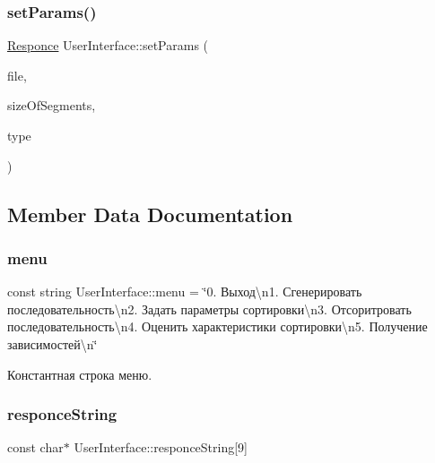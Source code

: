 \subsubsection{\texorpdfstring{set\+Params()}{setParams()}}
{\footnotesize\ttfamily \hyperlink{_structures_8h_a9864d6ef28dd6e38416afac4426b3491}{Responce} User\+Interface\+::set\+Params (\begin{DoxyParamCaption}\item[{\hyperlink{class_file_manager}{File\+Manager} $\ast$}]{file,  }\item[{long long}]{size\+Of\+Segments,  }\item[{\hyperlink{_structures_8h_adbb15722785daaf5166f7ea34323854c}{Type\+Of\+Sort}}]{type }\end{DoxyParamCaption})\hspace{0.3cm}{\ttfamily [private]}}



\subsection{Member Data Documentation}
\hypertarget{class_user_interface_a24b9a8a0a253382b0737a86f7ecf7d8b}{}\label{class_user_interface_a24b9a8a0a253382b0737a86f7ecf7d8b} 
\subsubsection{\texorpdfstring{menu}{menu}}
{\footnotesize\ttfamily const string User\+Interface\+::menu = \char`\"{}0. Выход\textbackslash{}n1. Сгенерировать последовательность\textbackslash{}n2. Задать параметры сортировки\textbackslash{}n3. Отсоритровать последовательность\textbackslash{}n4. Оценить характеристики сортировки\textbackslash{}n5. Получение зависимостей\textbackslash{}n\char`\"{}\hspace{0.3cm}{\ttfamily [private]}}



Константная строка меню. 

\hypertarget{class_user_interface_a3ec4a2871150fd6b83ddf9d459aa0afc}{}\label{class_user_interface_a3ec4a2871150fd6b83ddf9d459aa0afc} 
\subsubsection{\texorpdfstring{responce\+String}{responceString}}
{\footnotesize\ttfamily const char$\ast$ User\+Interface\+::responce\+String\mbox{[}9\mbox{]}\hspace{0.3cm}{\ttfamily [private]}}

